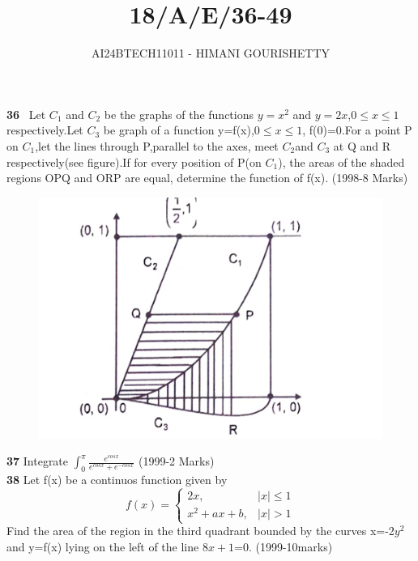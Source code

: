 \documentclass[journal,12pt,twocolumn]{IEEEtran}
\theoremstyle{remark}
\begin{document}

\vspace{3cm}

\title{18/A/E/36-49}
\author{AI24BTECH11011 - HIMANI GOURISHETTY}
\maketitle
\newpage
\bigskip

\renewcommand{\thefigure}{\theenumi}
\renewcommand{\thetable}{\theenumi}


\textbf{36}
\ Let $C_1$ and $C_2$ be the graphs of the functions $y=x^2$ and $y=2x$,$0\le x\le1$ respectively.Let $C_3$ be graph of a function y=f(x),$0\le x \le 1$, f(0)=0.For a point P on $C_1$,let the lines through P,parallel to the axes, meet $C_2$and $C_3$ at Q and R respectively(see figure).If for every position of P(on $C_1$), the areas of the shaded regions OPQ and ORP are equal, determine the function of f(x).
    \hfill{(1998-8 Marks)}
        \begin{figure}[h!]
	        \centering
		        \includegraphics[width=1\linewidth]{figs/fig1.png}
			        \label{fig:11011}
				    \end{figure}
				        
					\textbf{37}
					   Integrate $\int_{0}^{\pi}\frac{e^{cosx}}{e^{cosx}+e^{-cosx}}$
					            \hfill{(1999-2 Marks)}\\	             
							      \textbf{38}
							      Let f(x) be a continuos function given by \\
								     \[
								          f(x)=
									       \begin{cases}
									                2x,&|x|\le1\\
											         x^2+ax+b,&|x|>1
												      \end{cases}
												           \]
													    Find the area of the region in the third quadrant bounded by the curves x=-2$y^2$ and y=f(x) lying on the left of the line $8x+1$=0.  
													        \hfill{(1999-10marks)}\\
														    
\end{document}
